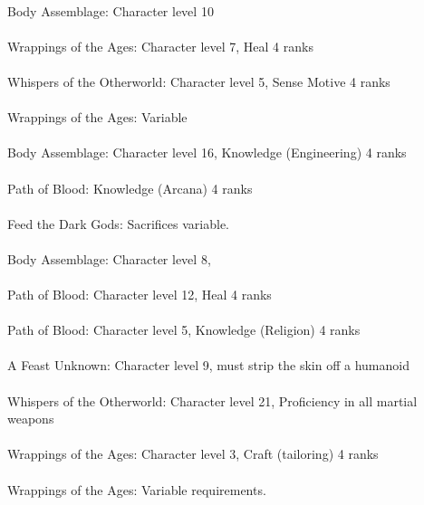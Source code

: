 \begin{multicols}{2}
\begin{small}
\\
Body Assemblage: Character level 10\\
\\
Wrappings of the Ages: Character level 7, Heal 4 ranks\\
\\
Whispers of the Otherworld: Character level 5, Sense Motive 4 ranks\\
\\
Wrappings of the Ages: Variable\\
\\
Body Assemblage: Character level 16, Knowledge (Engineering) 4 ranks\\
\\
Path of Blood: Knowledge (Arcana) 4 ranks\\
\\
Feed the Dark Gods: Sacrifices variable.\\
\\
Body Assemblage: Character level 8, \\
\\
Path of Blood: Character level 12, Heal 4 ranks\\
\\
Path of Blood: Character level 5, Knowledge (Religion) 4 ranks\\
\\
A Feast Unknown: Character level 9, must strip the skin off a humanoid\\
\\
Whispers of the Otherworld: Character level 21, Proficiency in all martial weapons\\
\\
Wrappings of the Ages: Character level 3, Craft (tailoring) 4 ranks\\
\\
Wrappings of the Ages: Variable requirements.\\

\end{small}
\end{multicols}
